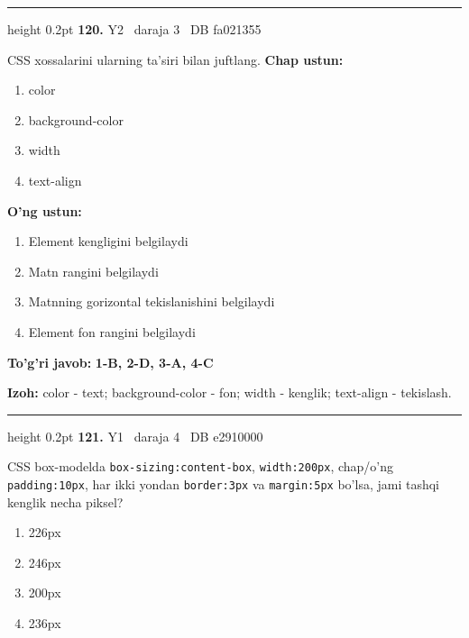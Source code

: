 \documentclass[10pt,a4paper,oneside]{article}
\begin{document}
\vspace{2mm}\hrule height 0.2pt \vspace{4mm}
\hypertarget{q120}{\textbf{\color{ink}120.}}  {\color{muted}\scriptsize Y2 \textbullet\ daraja 3 \textbullet\ DB fa021355}
\par
CSS xossalarini ularning ta'siri bilan juftlang.
\textbf{\footnotesize Chap ustun:}
\begin{enumerate}[label=\arabic*),leftmargin=9mm]
\item color
\item background-color
\item width
\item text-align
\end{enumerate}
\textbf{\footnotesize O'ng ustun:}
\begin{enumerate}[label=\Alph*),leftmargin=9mm]
\item Element kengligini belgilaydi
\item Matn rangini belgilaydi
\item Matnning gorizontal tekislanishini belgilaydi
\item Element fon rangini belgilaydi
\end{enumerate}
\begin{tcolorbox}[enhanced,breakable,colback=teal!4,colframe=teal!45!black,boxrule=0.45pt,arc=1.2mm,left=2.8mm,right=2.8mm,top=2mm,bottom=2mm,before skip=2mm,after skip=2mm]
\textbf{\color{teal}To'g'ri javob:} \textbf{1-B, 2-D, 3-A, 4-C}
\par\smallskip
\textbf{Izoh:} color - text; background-color - fon; width - kenglik; text-align - tekislash.
\end{tcolorbox}
\vspace{2mm}\hrule height 0.2pt \vspace{4mm}
\hypertarget{q121}{\textbf{\color{ink}121.}}  {\color{muted}\scriptsize Y1 \textbullet\ daraja 4 \textbullet\ DB e2910000}
\par
CSS box-modelda \texttt{box-sizing:content-box}, \texttt{width:200px}, chap/o'ng \texttt{padding:10px}, har ikki yondan \texttt{border:3px} va \texttt{margin:5px} bo'lsa, jami tashqi kenglik necha piksel?
\begin{enumerate}[label=\Alph*),leftmargin=9mm]
\item 226px
\item 246px
\item 200px
\item 236px
\end{enumerate}
\end{document}

